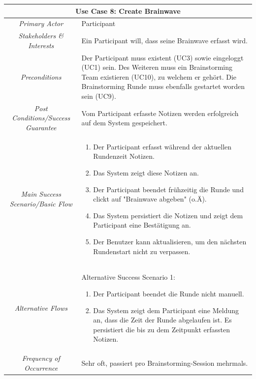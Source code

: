 \renewcommand{\arraystretch}{1.35}
\begin{center}
	\begin{longtable}{| c | p{7cm} |}
		\hline
		\multicolumn{2}{|c|}{\textbf{Use Case 8: Create Brainwave}}\\
		\hline\hline
		\textit{Primary Actor} & Participant\\
		\hline
		\textit{Stakeholders \& Interests} & Ein Participant will, dass seine Brainwave erfasst wird. \\
		\hline
		\textit{Preconditions} & Der Participant muss existent (UC3) sowie eingeloggt (UC1) sein. Des Weiteren muss ein Brainstorming Team existieren (UC10), zu welchem er gehört. Die Brainstorming Runde muss ebenfalls gestartet worden sein (UC9). \\
		\hline
		\textit{Post Conditions/Success Guarantee} & Vom Participant erfasste Notizen werden erfolgreich auf dem System gespeichert. \\
		\hline
		\textit{Main Success Scenario/Basic Flow} & 
		\begin{enumerate}[noitemsep]
			\item Der Participant erfasst während der aktuellen Rundenzeit Notizen.
			\item Das System zeigt diese Notizen an.
			\item Der Participant beendet frühzeitig die Runde und clickt auf "Brainwave abgeben" (o.Ä).
			\item Das System persistiert die Notizen und zeigt dem Participant eine Bestätigung an. 
			\item Der Benutzer kann aktualisieren, um den nächsten Rundenstart nicht zu verpassen.
		\end{enumerate}\\
		\hline
		\textit{Alternative Flows} &
		Alternative	Success Scenario 1:
		\begin{enumerate}[label=3.\alph*,noitemsep]
			\item Der Participant beendet die Runde nicht manuell.
			\item Das System zeigt dem Participant eine Meldung an, dass die Zeit der Runde abgelaufen ist. Es persistiert die bis zu dem Zeitpunkt erfassten Notizen.
		\end{enumerate}\\
	
		\hline
		
		\textit{Frequency of Occurrence} & Sehr oft, passiert pro Brainstorming-Session mehrmals.\\
		
		\hline
	\end{longtable}
\end{center}


